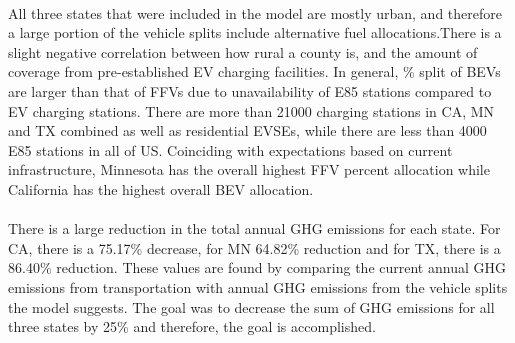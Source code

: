 \documentclass[answers]{exam}
\begin{document}
\\
All three states that were included in the model are mostly urban, and therefore a large portion of the vehicle splits include alternative fuel allocations.There is a slight negative correlation between how rural a county is, and the amount of coverage from pre-established EV charging facilities. In general, \% split of BEVs are larger than that of FFVs due to unavailability of E85 stations compared to EV charging stations. There are more than 21000 charging stations in CA, MN and TX combined as well as residential EVSEs, while there are less than 4000 E85 stations in all of US. Coinciding with expectations based on current infrastructure, Minnesota has the overall highest FFV percent allocation while California has the highest overall BEV allocation.
\\ ~\\
There is a large reduction in the total annual GHG emissions for each state. For CA, there is a 75.17\% decrease, for MN 64.82\% reduction and for TX, there is a 86.40\% reduction. These values are found by comparing the current annual GHG emissions from transportation with annual GHG emissions from the vehicle splits the model suggests. The goal was to decrease the sum of GHG emissions for all three states by 25\% and therefore, the goal is accomplished. 
\end{document}
